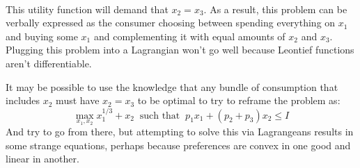 \documentclass[12pt,leqno]{article}
\begin{document}
\bigskip
{}\\
\indent This utility function will demand that $x_2 = x_3$. As a result, this problem can be verbally expressed as the consumer choosing between spending everything on $x_1$ and buying some $x_1$ and complementing it with equal amounts of $x_2$ and $x_3$. Plugging this problem into a Lagrangian won't go well because Leontief functions aren't differentiable.

\indent It may be possible to use the knowledge that any bundle of consumption that includes $x_2$ must have $x_2=x_3$ to be optimal to try to reframe the problem as:
$$\max_{x_1, x_2} x_1^{1/3} + x_2 \;\; \text{such that} \;\; p_1 x_1 + (p_2 + p_3)x_2 \leq I$$
And try to go from there, but attempting to solve this via Lagrangeans results in some strange equations, perhaps because preferences are convex in one good and linear in another.
\end{document}
